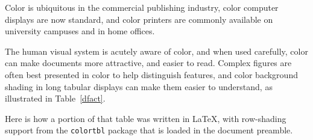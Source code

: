 
Color is ubiquitous in the commercial publishing industry, color
computer displays are now standard, and color printers are commonly
available on university campuses and in home offices.

The human visual system is acutely aware of color, and when used
carefully, color can make documents more attractive, and easier to
read.  Complex figures are often best presented in color to help
distinguish features, and color background shading in long tabular
displays can make them easier to understand, as illustrated in
Table~\vref{dfact}.

Here is how a portion of that table was written in \LaTeX{}, with
row-shading support from the \texttt{colortbl} package that is loaded
in the document preamble.


